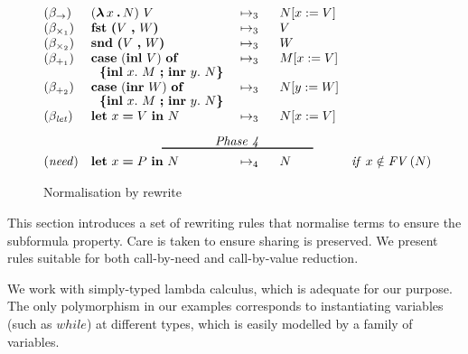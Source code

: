 {\begin{figure*}[t]
\[\begin{array}[t]{@{}lllll@{}}


(\beta_{\rightarrow})
& \expapp{(\expabs{x}{A}{N})}{V}
& \ \rewrite{}{3}{}\ \
& \sbs{N}{x}{V}
& \\[0pt]

(\beta_{\times_1})
& \expfst{\expprd{V}{W}}
& \ \rewrite{}{3}{}\ \
& V
& \\[0pt]

(\beta_{\times_2})
& \expsnd{\expprd{V}{W}}
& \ \rewrite{}{3}{}\ \
& W
& \\[0pt]

(\beta_{+_1})
& \expcasind{(\explft{V}{B})}{x}{M}{y}{N}
& \ \rewrite{}{3}{}\ \
& \sbs{M}{x}{V}
& \\[0pt]

(\beta_{+_2})
& \expcasind{(\exprgt{A}{W})}{x}{M}{y}{N}
& \ \rewrite{}{3}{}\ \
& \sbs{N}{y}{W}
& \\[0pt]

(\beta_{\txt{let}})
& \expshr{x}{V}{N}
& \ \rewrite{}{3}{}\ \
& \sbs{N}{x}{V}
& \\[8pt]

\multicolumn{5}{@{}c@{}}{\txt{Phase 4}}\\[-9pt]
\multicolumn{5}{@{}c@{}}{\rule{120pt}{1pt}}\\[1pt]

(\txt{need})
& \expshr{x}{\nv}{N}
& \ \rewrite{}{4}{}\ \
& N %
& \cnd{%
       x \notin \fv{N}}\\[0pt]
\end{array}
\]
\caption{Normalisation by rewrite}
\label{fig:norm}
\end{figure*}
}


\figterm
\fignf
\fignorm


This section introduces a set of rewriting rules that normalise terms
to ensure the subformula property. Care is taken to ensure sharing is
preserved. We present rules suitable for both call-by-need and
call-by-value reduction.

We work with simply-typed lambda calculus, which is adequate for
our purpose. The only polymorphism in our examples corresponds to
instantiating variables (such as $\mathit{while}$) at different types,
which is easily modelled by a family of variables.

